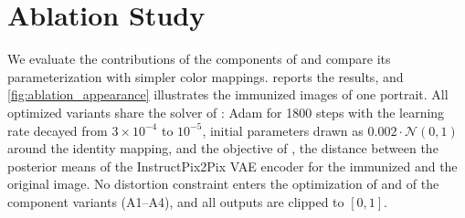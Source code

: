 \clearpage
\setcounter{page}{1}
\maketitlesupplementary
\setcounter{section}{0}
\renewcommand{\thesection}{\Alph{section}}
\renewcommand{\theHsection}{supp.\Alph{section}}
\setcounter{topnumber}{4}\setcounter{dbltopnumber}{4}\setcounter{totalnumber}{8}
\renewcommand{\topfraction}{0.95}\renewcommand{\dbltopfraction}{0.95}\renewcommand{\textfraction}{0.05}
\renewcommand{\floatpagefraction}{0.05}\renewcommand{\dblfloatpagefraction}{0.3}

\begingroup\makeatletter\setcounter{tocdepth}{-1}\renewcommand{\contentsname}{Contents}\renewcommand{\l@section}[2]{\@dottedtocline{1}{0em}{1.6em}{\bfseries #1}{#2}}\renewcommand{\l@subsection}[2]{\@dottedtocline{2}{1.6em}{2.3em}{#1}{#2}}\footnotesize\tableofcontents\makeatother\endgroup









\section{Ablation Study}
\label{sec:supp_ablation}
We evaluate the contributions of the components of \capg{} and compare its parameterization with simpler color mappings.  reports the results, and \cref{fig:ablation_appearance} illustrates the immunized images of one portrait. All optimized variants share the solver of \capg{}: Adam for 1800 steps with the learning rate decayed from $3\times10^{-4}$ to $10^{-5}$, initial parameters drawn as $0.002\cdot\mathcal{N}(0, 1)$ around the identity mapping, and the objective of \capg{}, the distance between the posterior means of the InstructPix2Pix VAE encoder for the immunized and the original image. No distortion constraint enters the optimization of \capg{} and of the component variants (A1--A4), and all outputs are clipped to $[0, 1]$.

